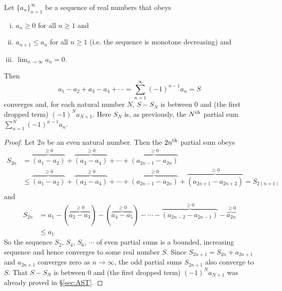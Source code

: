 \begin{theorem}
 Let $\big\{a_n\big\}_{n=1}^\infty$
be a sequence of real numbers that obeys
\begin{enumerate}[(i)]\itemsep1pt \parskip0pt  %
\item $a_n\ge 0$ for all $n\ge 1$ and
\item $a_{n+1}\le a_n$  for all $n\ge 1$ (i.e. the
sequence is monotone decreasing) and
\item $\lim_{n\rightarrow\infty}a_n=0$.
\end{enumerate}
Then
\begin{equation*}
a_1-a_2+a_3-a_4+\cdots=\sum\limits_{n=1}^\infty (-1)^{n-1} a_n =S
\end{equation*}
converges and, for each natural number $N$,  $S-S_N$ is between $0$ and (the
first dropped term) $(-1)^N a_{N+1}$. Here $S_N$ is, as previously,
the $N^{\rm th}$ partial sum $\sum\limits_{n=1}^N (-1)^{n-1} a_n$.
\end{theorem}

\begin{proof}
Let $2n$ be an even natural number. Then the $2n^{\rm th}$ partial sum
obeys
\begin{align*}
S_{2n}&=\overbrace{(a_1-a_2)}^{\ge 0}
                +\overbrace{(a_3-a_4)}^{\ge 0}+\cdots
                +\overbrace{(a_{2n-1}-a_{2n})}^{\ge 0} \\
&\le\overbrace{(a_1-a_2)}^{\ge 0}
                +\overbrace{(a_3-a_4)}^{\ge 0}+\cdots
                +\overbrace{(a_{2n-1}-a_{2n})}^{\ge 0}
                +\overbrace{(a_{2n+1}-a_{2n+2})}^{\ge 0}
  =S_{2(n+1)} \\
\end{align*}
and
\begin{align*}
S_{2n}&=a_1-(\overbrace{a_2-a_3}^{\ge 0})
                         -(\overbrace{a_4-a_5}^{\ge 0})-\cdots
                         -\overbrace{(a_{2n-2}-a_{2n-1})}^{\ge 0}
                         -\overbrace{a_{2n}}^{\ge 0} \\
      &\le a_1
\end{align*}
So the sequence $S_2$, $S_4$, $S_6$, $\cdots$ of even partial sums
is a bounded, increasing sequence and hence converges to some real
number $S$. Since $S_{2n+1} = S_{2n} +a_{2n+1}$ and $a_{2n+1}$
converges zero as $n\rightarrow\infty$, the odd partial sums $S_{2n+1}$
also converge to $S$. That $S-S_N$ is between $0$ and (the
first dropped term) $(-1)^N a_{N+1}$ was already proved
in \S\ref{sec:AST}.
\end{proof}

